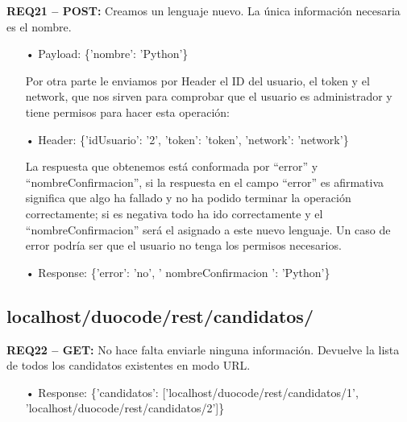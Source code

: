 \textbf{REQ21 – POST:} Creamos un lenguaje nuevo. La única información necesaria es el nombre.

\begin{itemize}
\item[•]
Payload: 
\{'nombre': 'Python'\}
\vspace{1em}

Por otra parte le enviamos por Header el ID del usuario, el token y el network, que nos sirven para comprobar que el usuario es administrador y tiene permisos para hacer esta operación:

\item[•]
Header: 
\{'idUsuario': '2', 'token': 'token', 'network': 'network'\}
\vspace{1em}

La respuesta que obtenemos está conformada por “error” y “nombreConfirmacion”, si la respuesta en el campo “error” es afirmativa significa que algo ha fallado y no ha podido terminar la operación correctamente; si es negativa todo ha ido correctamente y el “nombreConfirmacion” será el asignado a este nuevo lenguaje. Un caso de error podría ser que el usuario no tenga los permisos necesarios.

\item[•]
Response: 
\{'error': 'no', ' nombreConfirmacion ': 'Python'\}

\end{itemize}

\subsection{localhost/duocode/rest/candidatos/}
\textbf{REQ22 – GET:} No hace falta enviarle ninguna información. Devuelve la lista de todos los candidatos existentes en modo URL. 

\begin{itemize}
\item[•]
Response: 
\{'candidatos': ['localhost/duocode/rest/candidatos/1', 'localhost/duocode/rest/candidatos/2']\}
\end{itemize}

